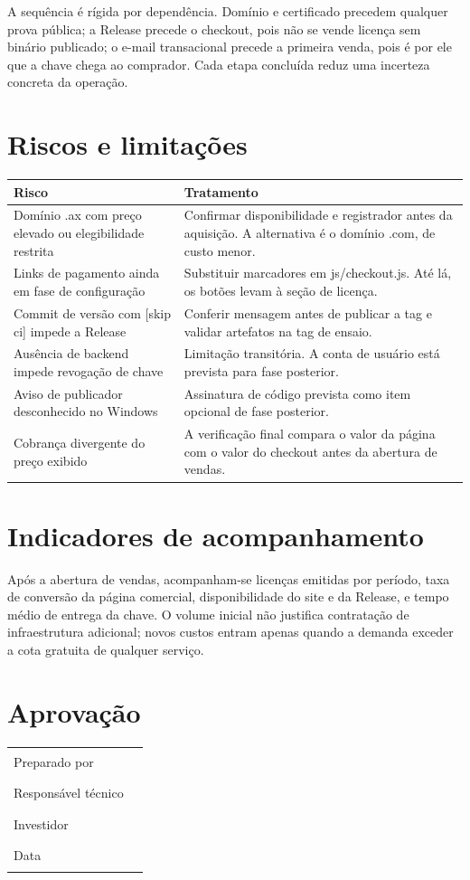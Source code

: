 ﻿\documentclass[11pt,a4paper]{article}
\begin{document}
A sequência é rígida por dependência. Domínio e certificado precedem qualquer prova pública; a Release precede o checkout, pois não se vende licença sem binário publicado; o e-mail transacional precede a primeira venda, pois é por ele que a chave chega ao comprador. Cada etapa concluída reduz uma incerteza concreta da operação.

\section{Riscos e limitações}

\begin{table}[h]
\centering
\begin{tabular}{|p{4.4cm}|p{9.8cm}|}
\hline
Risco & Tratamento \\
\hline
Domínio .ax com preço elevado ou elegibilidade restrita & Confirmar disponibilidade e registrador antes da aquisição. A alternativa é o domínio .com, de custo menor. \\
Links de pagamento ainda em fase de configuração & Substituir marcadores em js/checkout.js. Até lá, os botões levam à seção de licença. \\
Commit de versão com [skip ci] impede a Release & Conferir mensagem antes de publicar a tag e validar artefatos na tag de ensaio. \\
Ausência de backend impede revogação de chave & Limitação transitória. A conta de usuário está prevista para fase posterior. \\
Aviso de publicador desconhecido no Windows & Assinatura de código prevista como item opcional de fase posterior. \\
Cobrança divergente do preço exibido & A verificação final compara o valor da página com o valor do checkout antes da abertura de vendas. \\
\hline
\end{tabular}\end{table}

\section{Indicadores de acompanhamento}

Após a abertura de vendas, acompanham-se licenças emitidas por período, taxa de conversão da página comercial, disponibilidade do site e da Release, e tempo médio de entrega da chave. O volume inicial não justifica contratação de infraestrutura adicional; novos custos entram apenas quando a demanda exceder a cota gratuita de qualquer serviço.

\section{Aprovação}

\begin{tabular}{|l|l|}
Preparado por & \rule{6.5cm}{0.4pt} \\
Responsável técnico & \rule{6.5cm}{0.4pt} \\
Investidor & \rule{6.5cm}{0.4pt} \\
Data & \rule{6.5cm}{0.4pt} \\
\end{tabular}
\end{document}
